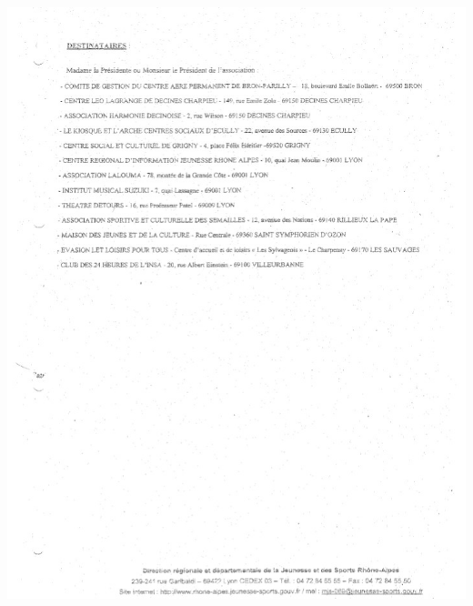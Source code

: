 \documentclass[hidelinks, paper=a4, fontsize=13pt]{report}
\begin{document}
\begin{center}
\includegraphics[scale=0.65]{Annexes/Documents/AgrementJeunesseEtSports2}
\end{center}
\end{document}
